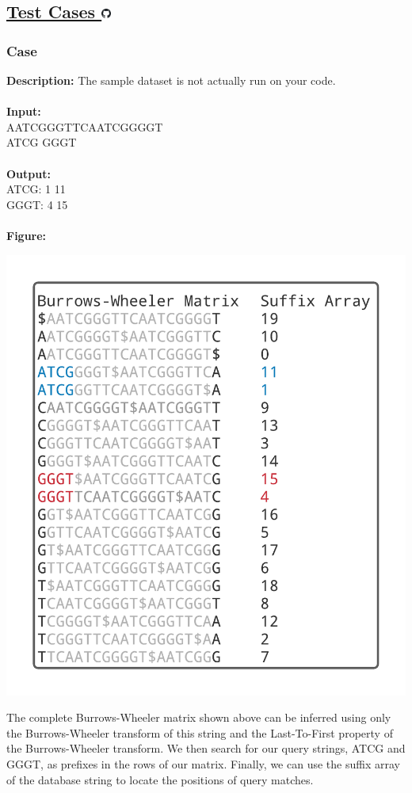 \documentclass{article}
\newcommand{\code}[1]{{\fontfamily{pcr}\selectfont #1}}
\newcommand{\gitlogo}{\includegraphics[height=12.5]{c0/gitlogo.png}}
\begin{document}
\subsection*{\href{https://github.com/rjeveloff/BA_problemregister/tree/main/test_cases/chapter_9/9H}{Test Cases \gitlogo}}
\subsubsection*{Case }
\hline \vspace{5}
\textbf{Description:} The sample dataset is not actually run on your code.\\ \\
\noindent \textbf{Input:}\\
\code{AATCGGGTTCAATCGGGGT\\ ATCG GGGT}\\ \\
\noindent \textbf{Output:}\\
\code{ATCG: 1 11\\ GGGT: 4 15}\\ \\
\noindent \textbf{Figure:}
\begin{center}
    \includegraphics[scale=0.24]{c9/figures/9H.png}
\end{center}
\noindent The complete Burrows-Wheeler matrix shown above can be inferred using only the Burrows-Wheeler transform of this string and the Last-To-First property of the Burrows-Wheeler transform. We then search for our query strings, \code{ATCG} and \code{GGGT}, as prefixes in the rows of our matrix. Finally, we can use the suffix array of the database string to locate the positions of query matches.
\pagebreak
\end{document}
